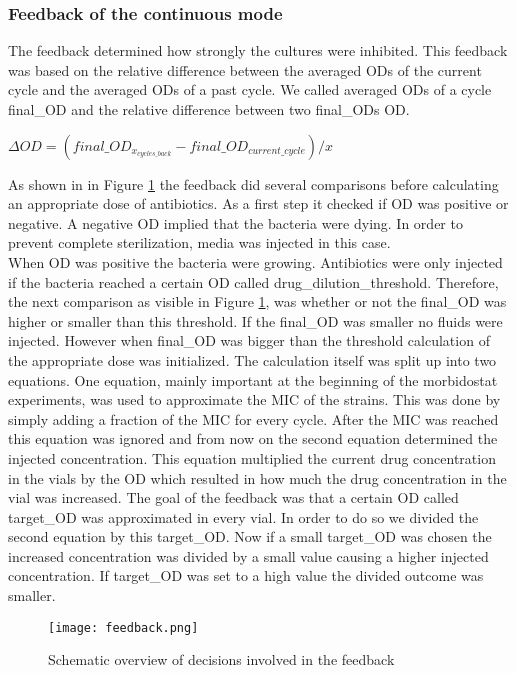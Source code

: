 \subsubsection{Feedback of the continuous mode} 
The feedback determined how strongly the cultures were inhibited. This feedback was based on the relative difference between the averaged ODs of the current cycle and the averaged ODs of a past cycle. We called averaged ODs of a cycle final\_OD and the relative difference between two final\_ODs \textDelta OD. 
\begin{center}
	$\Delta OD = (final\_OD_{x_{cycles\_back}} - final\_OD_{current\_cycle})/x$
\end{center}
As shown in in Figure \ref{figure:feedback} the feedback did several comparisons before calculating an appropriate dose of antibiotics. As a first step it checked if \textDelta OD was positive or negative. A negative \textDelta OD implied that the bacteria were dying. In order to prevent complete sterilization, media was injected in this case. \\
When \textDelta OD was positive the bacteria were growing. Antibiotics were only injected if the bacteria reached a certain OD called drug\_dilution\_threshold. Therefore, the next comparison as visible in Figure \ref{figure:feedback}, was whether or not the final\_OD was higher or smaller than this threshold. If the final\_OD was smaller no fluids were injected.
However when final\_OD was bigger than the threshold calculation of the appropriate dose was initialized.
The calculation itself was split up into two equations. One equation, mainly important at the beginning of the morbidostat experiments, was used to approximate the MIC of the strains. This was done by simply adding a fraction of the MIC for every cycle. After the MIC was reached this equation was ignored and from now on the second equation determined the injected concentration. This equation multiplied the current drug concentration in the vials by the \textDelta OD which resulted in how much the drug concentration in the vial was increased.
The goal of the feedback was that a certain OD called target\_OD was approximated in every vial. In order to do so we divided the second equation by this target\_OD. Now if a small target\_OD was chosen the increased concentration was divided by a small value causing a higher injected concentration. If target\_OD was set to a high value the divided outcome was smaller. 

\begin{figure}
	\texttt{[image: feedback.png]}
	\caption{Schematic overview of decisions involved in the feedback}
	\label{figure:feedback}
\end{figure}

